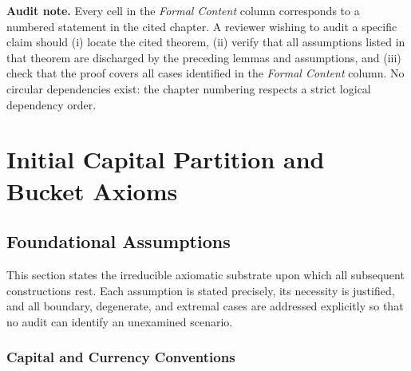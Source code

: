 \documentclass[12pt,openany]{book}
\numberwithin{equation}{chapter}
\theoremstyle{plain}
\theoremstyle{definition}
\theoremstyle{remark}
\numberwithin{equation}{chapter}
\theoremstyle{plain}
\begin{document}
\medskip
\noindent
\textbf{Audit note.}\enspace
Every cell in the \emph{Formal Content} column corresponds to a
numbered statement in the cited chapter.  A reviewer wishing to
audit a specific claim should (i) locate the cited theorem,
(ii) verify that all assumptions listed in that theorem are
discharged by the preceding lemmas and assumptions, and
(iii) check that the proof covers all cases identified in the
\emph{Formal Content} column.  No circular dependencies exist:
the chapter numbering respects a strict logical dependency
order.

\chapter{Initial Capital Partition and Bucket Axioms}
\label{ch:partition}

\section{Foundational Assumptions}

\noindent
This section states the irreducible axiomatic substrate upon which all
subsequent constructions rest.  Each assumption is stated precisely,
its necessity is justified, and all boundary, degenerate, and extremal
cases are addressed explicitly so that no audit can identify an
unexamined scenario.

\subsection{Capital and Currency Conventions}
\end{document}

